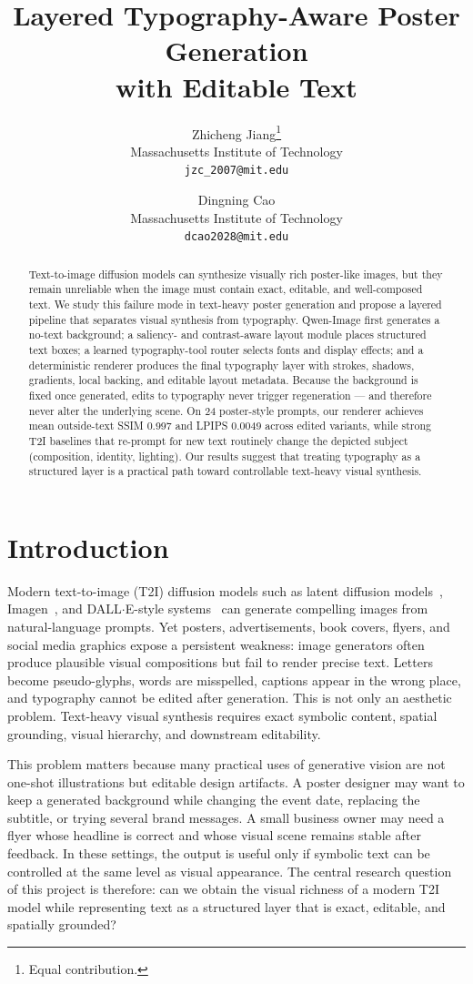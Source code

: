 \documentclass[10pt,twocolumn,letterpaper]{article}
\title{Layered Typography-Aware Poster Generation\\
with Editable Text}
\author{Zhicheng Jiang\thanks{Equal contribution.}\\
Massachusetts Institute of Technology\\
{\tt\small jzc\_2007@mit.edu}
\and
Dingning Cao\footnotemark[1]\\
Massachusetts Institute of Technology\\
{\tt\small dcao2028@mit.edu}}
\begin{document}
\maketitle

\begin{abstract}
Text-to-image diffusion models can synthesize visually rich poster-like images, but they remain unreliable when the image must contain exact, editable, and well-composed text. We study this failure mode in text-heavy poster generation and propose a layered pipeline that separates visual synthesis from typography. Qwen-Image first generates a no-text background; a saliency- and contrast-aware layout module places structured text boxes; a learned typography-tool router selects fonts and display effects; and a deterministic renderer produces the final typography layer with strokes, shadows, gradients, local backing, and editable layout metadata. Because the background is fixed once generated, edits to typography never trigger regeneration --- and therefore never alter the underlying scene. On 24 poster-style prompts, our renderer achieves mean outside-text SSIM 0.997 and LPIPS 0.0049 across edited variants, while strong T2I baselines that re-prompt for new text routinely change the depicted subject (composition, identity, lighting). Our results suggest that treating typography as a structured layer is a practical path toward controllable text-heavy visual synthesis.
\end{abstract}

\section{Introduction}

Modern text-to-image (T2I) diffusion models such as latent diffusion models~\cite{rombach2022ldm}, Imagen~\cite{saharia2022imagen}, and DALL$\cdot$E-style systems~\cite{betker2023dalle3} can generate compelling images from natural-language prompts. Yet posters, advertisements, book covers, flyers, and social media graphics expose a persistent weakness: image generators often produce plausible visual compositions but fail to render precise text. Letters become pseudo-glyphs, words are misspelled, captions appear in the wrong place, and typography cannot be edited after generation. This is not only an aesthetic problem. Text-heavy visual synthesis requires exact symbolic content, spatial grounding, visual hierarchy, and downstream editability.

This problem matters because many practical uses of generative vision are not one-shot illustrations but editable design artifacts. A poster designer may want to keep a generated background while changing the event date, replacing the subtitle, or trying several brand messages. A small business owner may need a flyer whose headline is correct and whose visual scene remains stable after feedback. In these settings, the output is useful only if symbolic text can be controlled at the same level as visual appearance. The central research question of this project is therefore: can we obtain the visual richness of a modern T2I model while representing text as a structured layer that is exact, editable, and spatially grounded?
\end{document}
